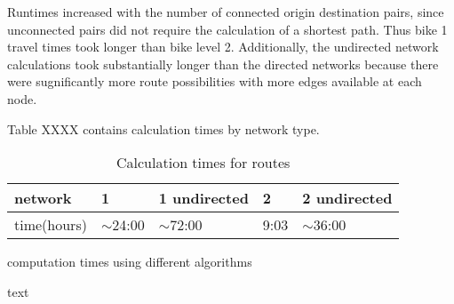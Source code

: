 Runtimes increased with the number of connected origin destination pairs, since unconnected pairs  did not require the calculation of a shortest path. Thus bike 1 travel times took longer than bike level 2. Additionally, the undirected network calculations took substantially longer than the directed networks because there were sugnificantly more route possibilities with more edges available at each node. 

Table XXXX contains calculation times by network type. 



\begin{table}[]
\centering
\begin{tabular}{@{}l|llll@{}}
network     & 1           & 1 undirected & 2    & 2 undirected \\ \hline
time(hours) & $\sim$24:00 & $\sim$72:00  & 9:03 & $\sim$36:00 
\end{tabular}
\caption{Calculation times for routes}
\label{table:net_calc_times}
\end{table}

\begin{table}
\centering
\caption{computation times using different algorithms}
\label{table:comp_times_algo}
\end{table}


text